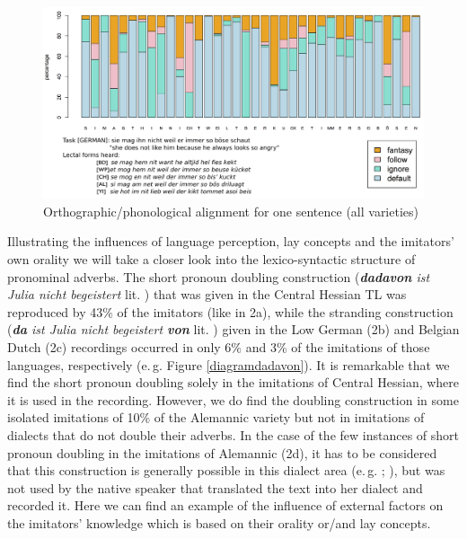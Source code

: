 \documentclass[output=paper]{LSP/langsci}
\begin{document}
\begin{figure}[h!]
\centering

\includegraphics[width=\textwidth]{illustrations/schaf_etal_fig2}%
\caption{\label{alignment1}Orthographic/phonological alignment for one sentence (all varieties)}%
	\end{figure}
\FloatBarrier

Illustrating the influences of language perception, lay concepts and the imitators’ own orality we will take a closer look into the lexico-syntactic structure of pronominal adverbs. The short pronoun doubling construction (\textit{\textbf{dadavon} ist Julia nicht begeistert}  lit. ) that was given in the Central Hessian TL was reproduced by 43\% of the imitators (like in 2a), while the stranding construction (\textit{\textbf{da} ist Julia nicht begeistert \textbf{von}} lit. ) given in the Low German (2b) and Belgian Dutch (2c) recordings occurred in only  6\% and 3\% of the imitations of those languages, respectively (e.\,g. Figure \ref{diagramdadavon}).  It is remarkable that we find the short pronoun doubling solely in the imitations of Central Hessian, where it is used in the recording. However, we do find the doubling construction in some isolated imitations of 10\% of the Alemannic variety but not in imitations of dialects that do not double their adverbs. In the case of the few instances of short pronoun doubling in the imitations of Alemannic (2d), it has to be considered that this construction is generally possible in this dialect area (e.\,g. \cite{fleischer_syntax_2002}; \cite[Round 1 Questions 11, 12; Round 2 Question 21]{ADA}), but was not used by the native speaker that translated the text into her dialect and recorded it. Here we can find an example of the influence of external factors on the imitators’ knowledge which is based on their orality or/and lay concepts.
\end{document}
